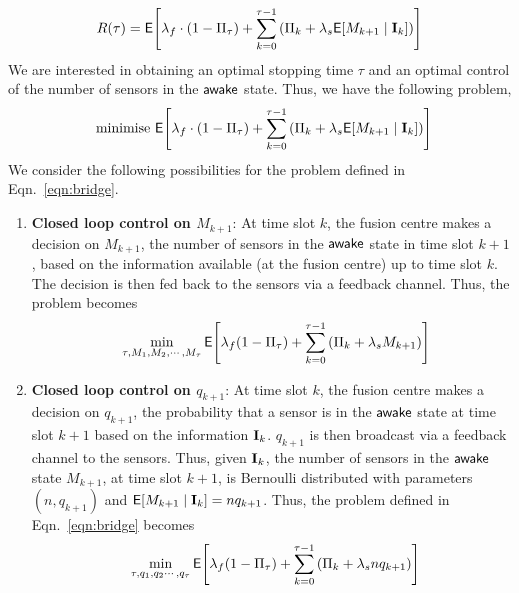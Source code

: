 \documentclass[journal]{IEEEtran}
\newcommand{\wake}{{${\sf awake }$}}
\newcommand{\EXP}[1]{\mathsf{E}\!\left[#1\right]}
\begin{document}
\begin{eqnarray}
R(\tau) = \EXP{\lambda_f \cdot (1-\Pi_\tau) + \sum_{k=0}^{\tau-1}
\left( \Pi_k + \lambda_s \EXP{ M_{k+1} \mid {\bf I}_k} \right)} 
\end{eqnarray}
We are interested in obtaining an optimal stopping time $\tau$ and an
optimal control of the number of sensors in the {\wake} state. Thus, we
have the following problem, 
\begin{eqnarray}
\label{eqn:bridge}
\text{minimise} \ \EXP{
\lambda_f \cdot (1-\Pi_\tau) + \sum_{k=0}^{\tau-1}
\left( \Pi_k + \lambda_s \EXP{ M_{k+1} \mid {\bf I}_k} \right)} 
\hspace{-2mm}
\end{eqnarray}
We consider the following possibilities for the problem defined in Eqn.~\ref{eqn:bridge}.
\begin{enumerate}
\item {\bf Closed loop control on $M_{k+1}$}: 
      At time slot $k$, the fusion centre makes a decision on $M_{k+1}$, the number of 
      sensors in the {\wake} state in time slot $k+1$, based on the information 
      available (at the fusion centre) up to time slot $k$. The decision is then 
      fed back to the sensors via a feedback channel. Thus, the problem becomes
\begin{eqnarray}
      \label{eqn:closed-cost-fn-M}
\min_{\tau, M_1, M_2, \cdots, M_\tau} 
       \EXP{ \lambda_f  (1-\Pi_{\tau}) + \sum_{k=0}^{\tau-1} \left(\Pi_k
	   + \lambda_s  M_{k+1}\right) } \hspace{-2mm}
      \end{eqnarray}

\item {\bf Closed loop control on $q_{k+1}$}: 
      At time slot $k$, the fusion centre makes a decision on $q_{k+1}$, the probability
      that a sensor is in the {\wake} state at time slot $k+1$ based on
	  the information ${\bf I}_k$. $q_{k+1}$ is 
      then broadcast via a feedback channel to the sensors. Thus, given
	  ${\bf I}_k$,
      the number of sensors in the {\wake} state $M_{k+1}$, at time slot $k+1$, is
      Bernoulli distributed with parameters $(n,q_{k+1})$ and 
	  $\EXP{M_{k+1}\mid {\bf I}_k} = nq_{k+1}$. 
	  Thus, the problem defined in Eqn.~\ref{eqn:bridge} becomes  
      \begin{eqnarray}
      \label{eqn:closed-cost-fn-q}
        \min_{\tau, q_{1}, q_2 \cdots,q_\tau} 
      \EXP{\lambda_f  (1-\Pi_{\tau}) + 
                      \sum_{k=0}^{\tau-1} \left(\Pi_k + \lambda_s
					  nq_{k+1}\right)} \hspace{-2mm} 
      \end{eqnarray}


\end{enumerate}
\end{document}
